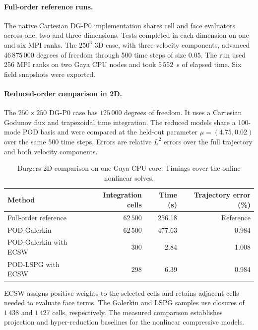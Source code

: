 \paragraph{Full-order reference runs.}
The native Cartesian DG-P0 implementation shares cell and face evaluators
across one, two and three dimensions. Tests completed in each dimension on
one and six MPI ranks. The $250^3$ 3D case, with three velocity components,
advanced $46\,875\,000$ degrees of freedom through 500 time steps of size
$0.05$. The run used 256 MPI ranks on two Gaya CPU nodes and took
$5\,552$~s of elapsed time. Six field snapshots were exported.

\paragraph{Reduced-order comparison in 2D.}
The $250\times250$ DG-P0 case has $125\,000$ degrees of freedom. It uses a
Cartesian Godunov flux and trapezoidal time integration. The reduced models
share a 100-mode POD basis and were compared at the held-out parameter
$\mu=(4.75,0.02)$ over the same 500 time steps. Errors are relative $L^2$
errors over the full trajectory and both velocity components.

\begin{table}[!htb]
\centering
\small
\caption{Burgers 2D comparison on one Gaya CPU core. Timings cover the
online nonlinear solves.}
\label{tab:app-feelpp-nlcrb:gaya-2d}
\begin{tabular}{@{}lrrr@{}}
\toprule
\textbf{Method} & \textbf{Integration cells} & \textbf{Time (s)} &
\textbf{Trajectory error (\%)}\\
\midrule
Full-order reference & $62\,500$ & 256.18 & Reference\\
POD-Galerkin & $62\,500$ & 477.63 & 0.984\\
POD-Galerkin with ECSW & 300 & 2.84 & 1.008\\
POD-LSPG with ECSW & 298 & 6.39 & 0.984\\
\bottomrule
\end{tabular}
\end{table}

ECSW assigns positive weights to the selected cells and retains adjacent
cells needed to evaluate face terms. The Galerkin and LSPG samples use
closures of $1\,438$ and $1\,427$ cells, respectively. The measured
comparison establishes projection and hyper-reduction baselines for
the nonlinear compressive models.
